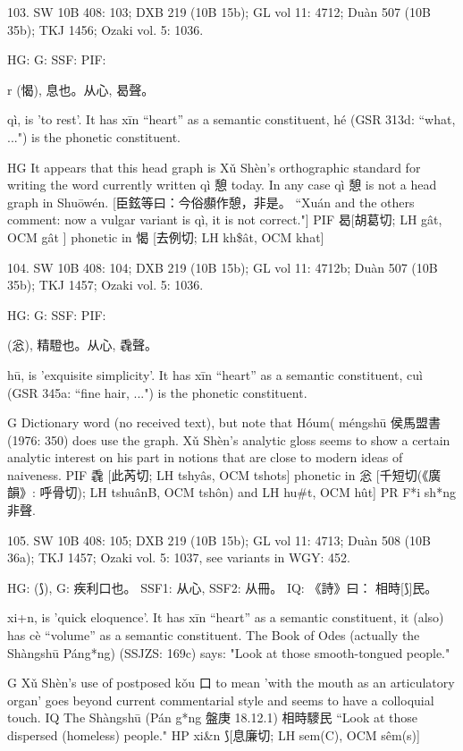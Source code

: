 103. SW 10B 408: 103; DXB 219 (10B 15b); GL vol 11: 4712; Duàn 507 (10B 35b); TKJ 1456; Ozaki vol. 5: 1036.


HG:
G: SSF: PIF:

r (愒), 息也。从心,
曷聲。


qì,
is 'to rest'.
It has xīn ``heart'' as a semantic constituent,
hé (GSR 313d: ``what, ...") is the phonetic constituent.

HG It appears that this head graph is Xǔ Shèn's orthographic standard for writing the word currently written qì 憩 today. In any case qì 憩 is not a head graph in Shuōwén.
[臣鉉等曰：今俗䫲作憩，非是。 ``Xuán and the others comment: now a vulgar variant is
qì, it is not correct."]
PIF	曷[胡葛切; LH gât, OCM gât ] phonetic in 愒 [去例切; LH kh\$ât, OCM khat]

104. SW 10B 408: 104; DXB 219 (10B 15b); GL vol 11: 4712b; Duàn 507 (10B 35b); TKJ 1457; Ozaki vol. 5: 1036.


HG:
G: SSF: PIF:

(忩),
精䮴也。从心,
毳聲。

hū,
is 'exquisite simplicity'.
It has xīn ``heart'' as a semantic constituent,
cuì (GSR 345a: ``fine hair, ...") is the phonetic constituent.

G Dictionary word (no received text), but note that Hóum( méngshū 侯馬盟書 (1976: 350) does use the graph. Xǔ Shèn's analytic gloss seems to show a certain analytic interest on his part in notions that are close to modern ideas of naiveness.
PIF 毳 [此芮切; LH tshyâs, OCM tshots] phonetic in 忩 [千短切(《廣韻》: 呼骨切); LH tshuânB, OCM tshôn) and LH hu\#t, OCM hût]
PR     F*i sh*ng 非聲.

105. SW 10B 408: 105; DXB 219 (10B 15b); GL vol 11: 4713; Duàn 508 (10B 36a); TKJ 1457; Ozaki vol. 5: 1037, see
variants in WGY: 452.


HG:	(⟆),
G:	疾利口也。
SSF1: 从心,
SSF2: 从冊。
IQ:	《詩》曰：
相時[⟆]民。

xi+n,
is 'quick eloquence'.
It has xīn ``heart'' as a semantic constituent,
it (also) has cè ``volume'' as a semantic constituent.
The Book of Odes (actually the Shàngshū Páng*ng) (SSJZS: 169c) says:
"Look at those smooth-tongued people."



G	Xǔ Shèn's use of postposed kǒu 口 to mean 'with the mouth as an articulatory organ' goes beyond current commentarial style and seems to have a colloquial touch.
IQ	The Shàngshū (Pán g*ng 盤庚 18.12.1) 相時䮮民 ``Look at those dispersed (homeless) people."
HP	xi&n ⟆[息廉切; LH sem(C), OCM sêm(s)]

